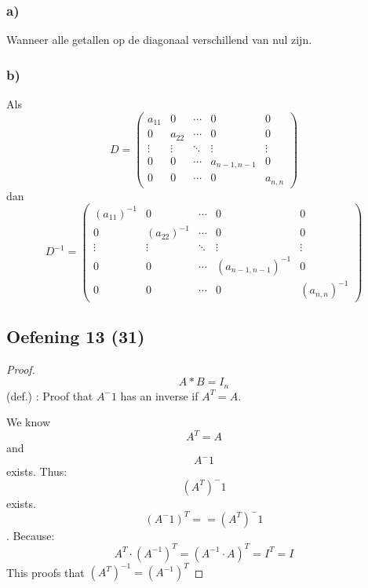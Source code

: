 \documentclass[lineaire_algebra_oplossingen.tex]{subfiles}
\begin{document}
\subsubsection*{a)}
Wanneer alle getallen op de diagonaal verschillend van nul zijn.
\subsubsection*{b)}
Als
$$ D = \begin{pmatrix}
a_{11} & 0 & \cdots & 0 & 0\\
0 & a_{22} & \cdots & 0 & 0\\
\vdots & \vdots & \ddots & \vdots & \vdots\\
0 & 0 & \cdots & a_{n-1,n-1} & 0 \\
0 & 0 & \cdots & 0 & a_{n,n}
\end{pmatrix}
$$
dan
$$ D^{-1} = \begin{pmatrix}
(a_{11})^{-1} & 0 & \cdots & 0 & 0\\
0 & (a_{22})^{-1} & \cdots & 0 & 0\\
\vdots & \vdots & \ddots & \vdots & \vdots\\
0 & 0 & \cdots & (a_{n-1,n-1})^{-1} & 0 \\
0 & 0 & \cdots & 0 & (a_{n,n})^{-1}
\end{pmatrix}
$$

\subsection{Oefening 13 (31)}

\begin{proof}

\[A*B = I_{n} \] (def.) : Proof that $A^-1$ has an inverse if $ A^T = A $.

We know \[A^T = A \] and \[ A^-1 \] exists.
Thus: \[(A^T)^-1 \] exists.
\[ (A^-1)^T ==  (A^T)^-1 \].
Because:
$$A^T\cdot (A^{-1})^T = (A^{-1}\cdot A)^T = I^T = I$$
This proofs that $(A^T)^{-1} = (A^{-1})^T$
\end{proof}
\end{document}

